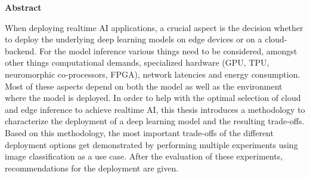 \vspace*{2cm}

\begin{center}
    \textbf{Abstract}
\end{center}

\vspace*{1cm}


\noindent When deploying realtime AI applications, a crucial aspect is the decision whether to deploy the underlying deep learning models on edge devices or on a cloud-backend.
For the model inference various things need to be considered, amongst other things computational demands,
specialized hardware (GPU, TPU, neuromorphic co-processors, FPGA),
network latencies and energy consumption. Most of these aspects depend on both the model as well as the environment where the model is deployed. 
In order to help with the optimal selection of cloud and edge inference to achieve realtime AI, this thesis introduces a methodology to characterize the deployment of a deep learning model and the resulting trade-offs.
Based on this methodology, the most important trade-offs of the different deployment options get demonstrated by performing multiple experiments using image classification as a use case. After the evaluation of these experiments, recommendations for the deployment are given.






